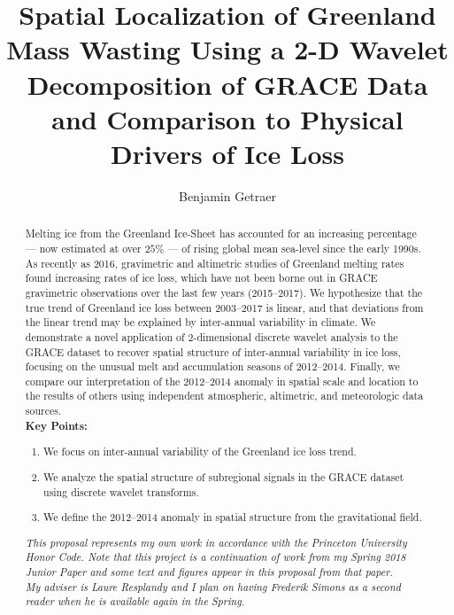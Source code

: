 \documentclass[12pt]{article}
\title{Spatial Localization of Greenland Mass Wasting Using a 2-D Wavelet Decomposition of GRACE Data and Comparison to Physical Drivers of Ice Loss}
\author{Benjamin Getraer}
\begin{document}

\maketitle

\begin{abstract}
Melting ice from the Greenland Ice-Sheet has accounted for an increasing percentage --- now estimated at over $25\%$ --- of rising global mean sea-level since the early 1990s. As recently as 2016, gravimetric and altimetric studies of Greenland melting rates found  increasing rates of ice loss, which have not been borne out in GRACE gravimetric observations over the last few years (2015--2017). We hypothesize that the true trend of Greenland ice loss between 2003--2017 is linear, and that deviations from the linear trend may be explained by inter-annual variability in climate. We demonstrate a novel application of 2-dimensional discrete wavelet analysis to the GRACE dataset to recover spatial structure of inter-annual variability in ice loss, focusing on the unusual melt and accumulation seasons of 2012--2014. Finally, we compare our interpretation of the 2012--2014 anomaly in spatial scale and location to the results of others using independent atmospheric, altimetric, and meteorologic data sources. \\[3em]

\textbf{Key Points:}
\begin{enumerate}
	\item We focus on inter-annual variability of the Greenland ice loss trend.
	\item We analyze the spatial structure of subregional signals in the GRACE dataset using discrete wavelet transforms.
	\item We define the 2012--2014 anomaly in spatial structure from the gravitational field.
\end{enumerate}

\textit{This proposal represents my own work in accordance with the Princeton University Honor Code. Note that this project is a continuation of work from my Spring 2018 Junior Paper and some text and figures appear in this proposal from that paper.\\
My adviser is Laure Resplandy and I plan on having Frederik Simons as a second reader when he is available again in the Spring.}

\end{abstract}
\end{document}
